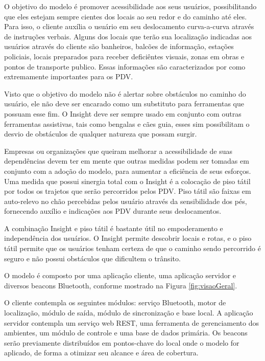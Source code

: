 \documentclass[english,brazilian]{UNISINOSmonografia}
\begin{document}
O objetivo do modelo é promover acessibilidade aos seus usuários, possibilitando que eles estejam sempre cientes dos locais ao seu redor e do caminho até eles. Para isso, o cliente auxília o usuário em seu deslocamento curva-a-curva através de instruções verbais. Alguns dos locais que terão sua localização indicadas aos usuários através do cliente são banheiros, balcões de informação, estações policiais, locais preparados para receber deficiêntes visuais, zonas em obras e pontos de transporte publico. Essas informações são caracterizados por  como extremamente importantes para os PDV.

Visto que o objetivo do modelo não é alertar sobre obstáculos no caminho do usuário, ele não deve ser encarado como um substituto para ferramentas que possuam esse fim. O Insight deve ser sempre usado em conjunto com outras ferramentas assistivas, tais como bengalas e cães guia, esses sim possibilitam o desvio de obstáculos de qualquer natureza que possam surgir. 

Empresas ou organizações que queiram melhorar a acessibilidade de suas dependências devem ter em mente que outras medidas podem ser tomadas em conjunto com a adoção do modelo, para aumentar a eficiência de seus esforços. Uma medida que possui sinergia total com o Insight é a colocação de piso tátil por todos os trajetos que serão percorridos pelos PDV. Piso tátil são faixas em auto-relevo no chão percebidas pelos usuário através da sensibilidade dos pés, fornecendo auxílio e indicações aos PDV durante seus deslocamentos.

A combinação Insight e piso tátil é bastante útil no empoderamento e independência dos usuários. O Insight permite descobrir locais e rotas, e o piso tátil permite que os usuários tenham certeza de que o caminho sendo percorrido é seguro e não possui obstáculos que dificultem o trânsito.

O modelo é composto por uma aplicação cliente, uma aplicação servidor e diversos beacons Bluetooth, conforme mostrado na Figura \ref{fig:visaoGeral}. 

O cliente contempla os seguintes módulos: serviço Bluetooth, motor de localização, módulo de saída, módulo de sincronização e base local. A aplicação servidor contempla um serviço web REST, uma ferramenta de gerenciamento dos ambientes, um módulo de controle e uma base de dados primária. Os beacons serão previamente distribuídos em pontos-chave do local onde o modelo for aplicado, de forma a otimizar seu alcance e área de cobertura.
\end{document}
